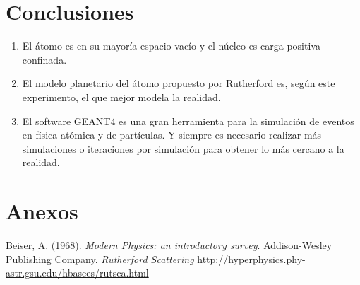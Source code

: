 \documentclass[conference]{IEEEtran}
\begin{document}
\section{Conclusiones}
\begin{enumerate}
    \item El átomo es en su mayoría espacio vacío y el núcleo es carga positiva confinada.
    \item El modelo planetario del átomo propuesto por Rutherford es, según este experimento, el que mejor modela la realidad.
    \item El software GEANT4 es una gran herramienta para la simulación de eventos en física atómica y de partículas. Y siempre es necesario realizar más simulaciones o iteraciones por simulación para obtener lo más cercano a la realidad.
\end{enumerate}

\section{Anexos}
        
        
        
        
\begin{thebibliography}{00}
 Beiser, A. (1968). \textit{Modern Physics: an introductory survey}. Addison-Wesley Publishing Company.
 \textit{Rutherford Scattering} \url{http://hyperphysics.phy-astr.gsu.edu/hbasees/rutsca.html}
\end{thebibliography}
\end{document}
